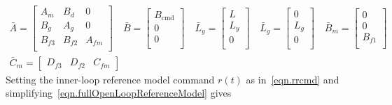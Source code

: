 \begin{equation*}
  \begin{gathered}
    \bar{A} =
    \begin{bmatrix}
      A_{m} & B_{d} & 0 \\
      B_{g} & A_{g} & 0 \\
      B_{f3} & B_{f2} & A_{fm} \\
    \end{bmatrix}
    \quad
    \bar{B} =
    \begin{bmatrix}
      B_{\text{cmd}} \\
      0 \\
      0 \\
    \end{bmatrix}
    \quad
    \bar{L}_{y} =
    \begin{bmatrix}
      L \\
      L_{y} \\
      0 \\
    \end{bmatrix}
    \quad
    \bar{L}_{g} =
    \begin{bmatrix}
      0 \\
      L_{g} \\
      0 \\
    \end{bmatrix}
    \quad
    \bar{B}_{m} =
    \begin{bmatrix}
      0 \\
      0 \\
      B_{f1} \\
    \end{bmatrix} \\
    \bar{C}_{m} =
    \begin{bmatrix}
      D_{f3} & D_{f2} & C_{fm}
    \end{bmatrix}
  \end{gathered}
\end{equation*}
Setting the inner-loop reference model command $r(t)$ as in\ \eqref{eqn.rrcmd} and simplifying\ \eqref{eqn.fullOpenLoopReferenceModel} gives
